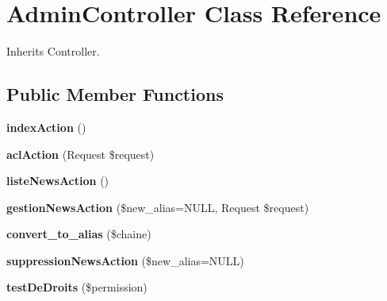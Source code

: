 \hypertarget{class_site_1_1_trail_bundle_1_1_controller_1_1_admin_controller}{}\section{Admin\+Controller Class Reference}
\label{class_site_1_1_trail_bundle_1_1_controller_1_1_admin_controller}


Inherits Controller.

\subsection*{Public Member Functions}
\begin{DoxyCompactItemize}
\item 
\hypertarget{class_site_1_1_trail_bundle_1_1_controller_1_1_admin_controller_a04f2101fe1cdc785b61219c2df753024}{}{\bfseries index\+Action} ()\label{class_site_1_1_trail_bundle_1_1_controller_1_1_admin_controller_a04f2101fe1cdc785b61219c2df753024}

\item 
\hypertarget{class_site_1_1_trail_bundle_1_1_controller_1_1_admin_controller_aa714100fd26cb8ee0b81910ccfa246db}{}{\bfseries acl\+Action} (Request \$request)\label{class_site_1_1_trail_bundle_1_1_controller_1_1_admin_controller_aa714100fd26cb8ee0b81910ccfa246db}

\item 
\hypertarget{class_site_1_1_trail_bundle_1_1_controller_1_1_admin_controller_a04c7edb8cce092c606d2d7ff72aafd5b}{}{\bfseries liste\+News\+Action} ()\label{class_site_1_1_trail_bundle_1_1_controller_1_1_admin_controller_a04c7edb8cce092c606d2d7ff72aafd5b}

\item 
\hypertarget{class_site_1_1_trail_bundle_1_1_controller_1_1_admin_controller_a41c6cb9c28a16cfa2edc46949136783d}{}{\bfseries gestion\+News\+Action} (\$new\+\_\+alias=N\+U\+L\+L, Request \$request)\label{class_site_1_1_trail_bundle_1_1_controller_1_1_admin_controller_a41c6cb9c28a16cfa2edc46949136783d}

\item 
\hypertarget{class_site_1_1_trail_bundle_1_1_controller_1_1_admin_controller_ac27131fb1b99c2ebd2eb9f8d6465b287}{}{\bfseries convert\+\_\+to\+\_\+alias} (\$chaine)\label{class_site_1_1_trail_bundle_1_1_controller_1_1_admin_controller_ac27131fb1b99c2ebd2eb9f8d6465b287}

\item 
\hypertarget{class_site_1_1_trail_bundle_1_1_controller_1_1_admin_controller_ace8f167ac8a79765e8d6235638a89941}{}{\bfseries suppression\+News\+Action} (\$new\+\_\+alias=N\+U\+L\+L)\label{class_site_1_1_trail_bundle_1_1_controller_1_1_admin_controller_ace8f167ac8a79765e8d6235638a89941}

\item 
\hypertarget{class_site_1_1_trail_bundle_1_1_controller_1_1_admin_controller_a49387e8719305355ba3fae06b0b9bc2a}{}{\bfseries test\+De\+Droits} (\$permission)\label{class_site_1_1_trail_bundle_1_1_controller_1_1_admin_controller_a49387e8719305355ba3fae06b0b9bc2a}

\end{DoxyCompactItemize}


